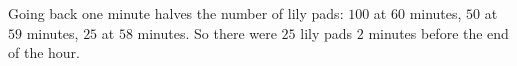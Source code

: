 Going back one minute halves the number of lily pads: $100$ at $60$ minutes, $50$ at $59$ minutes, $25$ at $58$ minutes. So there were $25$ lily pads $\boxed{2}$ minutes before the end of the hour.
